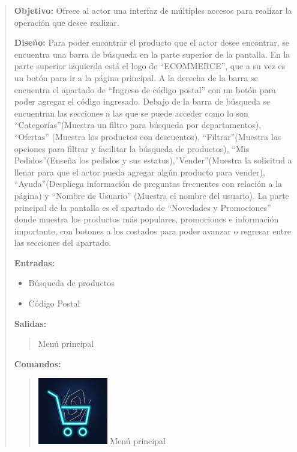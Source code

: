 \documentclass[14pt]{article}
\begin{document}
                \begin{quote}
                    \textbf{Objetivo:} Ofrece al actor una interfaz de múltiples accesos para realizar la operación que desee realizar.
                    
                    \textbf{Diseño:} Para poder encontrar el producto que el actor desee encontrar, se encuentra una barra de búsqueda en la parte superior de la pantalla. En la parte superior izquierda está el logo de “ECOMMERCE”, que a su vez es un botón para ir a la página principal.  A la derecha de la barra se encuentra el apartado de “Ingreso de código postal” con un botón para poder agregar el código ingresado. Debajo de la barra de búsqueda se encuentran las secciones a las que se puede acceder como lo son “Categorías”(Muestra un filtro para búsqueda por departamentos), “Ofertas” (Muestra los productos con descuentos), “Filtrar”(Muestra las opciones para filtrar y facilitar la búsqueda de productos), “Mis Pedidos”(Enseña los pedidos y sus estatus),”Vender”(Muestra la solicitud a llenar para que el actor pueda agregar algún producto para vender), “Ayuda”(Despliega información de preguntas frecuentes con relación a la página) y “Nombre de Usuario” (Muestra el nombre del usuario). La parte principal de la pantalla es el apartado de “Novedades y Promociones” donde muestra los productos más populares, promociones e información importante, con botones a los costados para poder avanzar o regresar entre las secciones del apartado.
    
                    \textbf{Entradas:} 
                        \begin{itemize}
                            \item Búsqueda de productos
                            \item Código Postal
                        \end{itemize}
                    
                    \textbf{Salidas:}
                        \begin{quote}
                            Menú principal
                        \end{quote}
                        
                    \textbf{Comandos:}
                        \begin{quote}
                            \includegraphics[height=0.02\textwidth]{BotonMenuPrincipal.jpg}
                            \label{P3:BotonMenuPrincipal}Menú principal
                           

\end{quote}
\end{quote}
\end{document}
